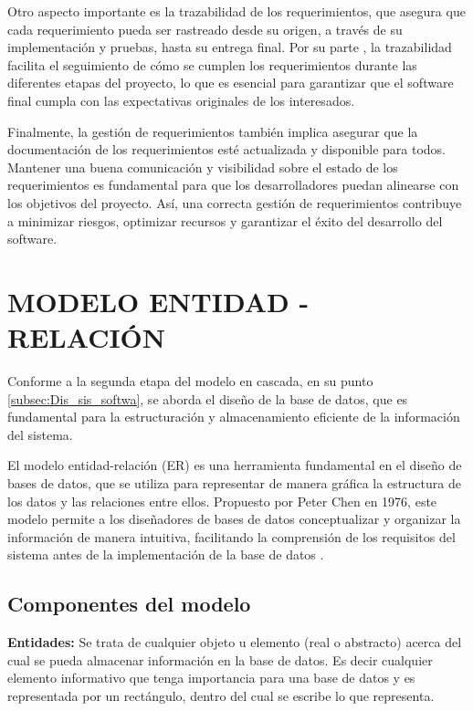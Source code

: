 		Otro aspecto importante es la trazabilidad de los requerimientos, que asegura que cada requerimiento pueda ser rastreado desde su origen, a través de su implementación y pruebas, hasta su entrega final. Por su parte \textcite{sommerville2011introduccion}, la trazabilidad facilita el seguimiento de cómo se cumplen los requerimientos durante las diferentes etapas del proyecto, lo que es esencial para garantizar que el software final cumpla con las expectativas originales de los interesados.
		
		Finalmente, la gestión de requerimientos también implica asegurar que la documentación de los requerimientos esté actualizada y disponible para todos. Mantener una buena comunicación y visibilidad sobre el estado de los requerimientos es fundamental para que los desarrolladores puedan alinearse con los objetivos del proyecto. Así, una correcta gestión de requerimientos contribuye a minimizar riesgos, optimizar recursos y garantizar el éxito del desarrollo del software.
				
	\section{MODELO ENTIDAD - RELACIÓN}
		Conforme a la segunda etapa del modelo en cascada, en su punto \ref{subsec:Dis_sis_softwa}, se aborda el diseño de la base de datos, que es fundamental para la estructuración y almacenamiento eficiente de la información del sistema.
		
		El modelo entidad-relación (ER) es una herramienta fundamental en el diseño de bases de datos, que se utiliza para representar de manera gráfica la estructura de los datos y las relaciones entre ellos. Propuesto por Peter Chen en 1976, este modelo permite a los diseñadores de bases de datos conceptualizar y organizar la información de manera intuitiva, facilitando la comprensión de los requisitos del sistema antes de la implementación de la base de datos \parencite{theentity1976Chen}.
		
	\subsection{Componentes del modelo}
		
		\textbf{Entidades:} Se trata de cualquier objeto u elemento (real o abstracto) acerca del cual se pueda almacenar información en la base de datos. Es decir cualquier elemento informativo que tenga importancia para una base de datos y es representada por un rectángulo, dentro del cual se escribe lo que representa.
		
